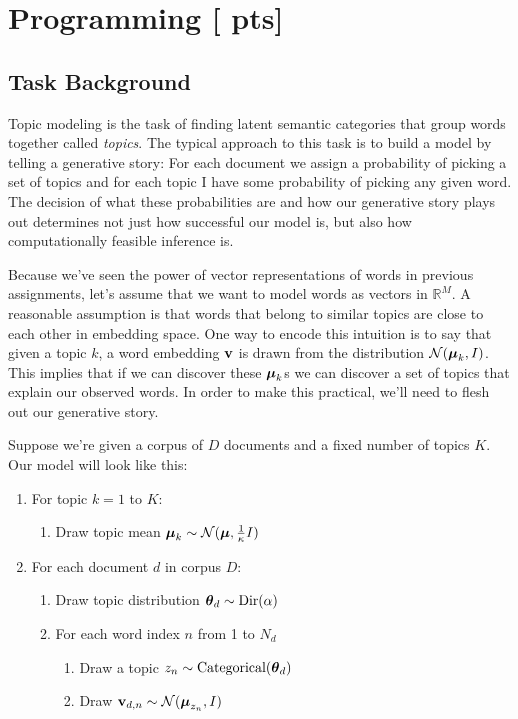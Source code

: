 \documentclass[11pt,addpoints,answers]{exam}
\numberwithin{equation}{section} %
\numberwithin{figure}{section} %
\numberwithin{table}{section} %
\newcommand{\pts}[1]{\textbf{[#1 pts]}}
\begin{document}
\clearpage

\section{Programming \pts{} }
\label{sec:code}

\subsection{Task Background}

Topic modeling is the task of finding latent semantic categories that group words together called \textit{topics}. The typical approach to this task is to build a model by telling a generative story: For each document we assign a probability of picking a set of topics and for each topic I have some probability of picking any given word. The decision of what these probabilities are and how our generative story plays out determines not just how successful our model is, but also how computationally feasible inference is.

Because we've seen the power of vector representations of words in previous assignments, let's assume that we want to model words as vectors in $\mathbb{R}^M$. A reasonable assumption is that words that belong to similar topics are close to each other in embedding space. One way to encode this intuition is to say that given a topic $k$, a word embedding $\mathbf{v}$ is drawn from the distribution $\mathcal{N}(\boldsymbol \mu_k, I)$. This implies that if we can discover these $\boldsymbol \mu_k$s we can discover a set of topics that explain our observed words. In order to make this practical, we'll need to flesh out our generative story. 

Suppose we're given a corpus of $D$ documents and a fixed number of topics $K$. Our model will look like this:

\begin{enumerate}
    \item For topic $k = 1$ to $K$:
    \begin{enumerate}
        \item Draw topic mean $\boldsymbol \mu_k \sim \mathcal{N}(\boldsymbol \mu, \frac{1}{\kappa}I)$
    \end{enumerate}
    \item For each document $d$ in corpus $D$:
    \begin{enumerate}
        \item Draw topic distribution $\boldsymbol \theta_d \sim \text{Dir}(\alpha)$
        \item For each word index $n$ from 1 to $N_d$
        \begin{enumerate}
            \item Draw a topic $z_n \sim \text{Categorical}(\boldsymbol \theta_d)$
            \item Draw $\mathbf{v}_{d, n} \sim \mathcal{N}(\boldsymbol \mu_{z_n}, I)$
        \end{enumerate}
    \end{enumerate}
\end{enumerate}
\end{document}

